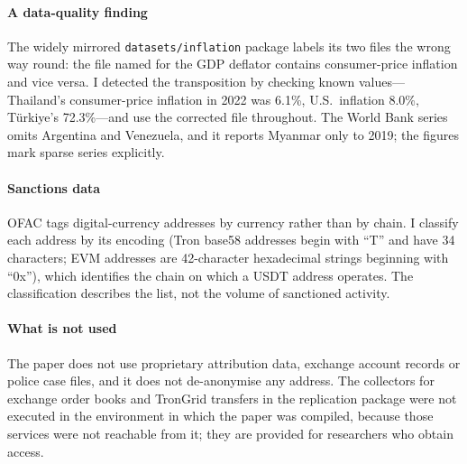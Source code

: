 \paragraph{A data-quality finding}
The widely mirrored \texttt{datasets/inflation} package labels its two files the wrong way round: the file named for
the GDP deflator contains consumer-price inflation and vice versa. I detected the transposition by checking known
values---Thailand's consumer-price inflation in 2022 was 6.1\%, U.S.\ inflation 8.0\%, Türkiye's 72.3\%---and use the
corrected file throughout. The World Bank series omits Argentina and Venezuela, and it reports Myanmar only to 2019;
the figures mark sparse series explicitly.

\paragraph{Sanctions data}
OFAC tags digital-currency addresses by currency rather than by chain. I classify each address by its encoding (Tron
base58 addresses begin with ``T'' and have 34 characters; EVM addresses are 42-character hexadecimal strings beginning
with ``0x''), which identifies the chain on which a USDT address operates. The classification describes the list, not
the volume of sanctioned activity.

\paragraph{What is not used}
The paper does not use proprietary attribution data, exchange account records or police case files, and it does not
de-anonymise any address. The collectors for exchange order books and TronGrid transfers in the replication package
were not executed in the environment in which the paper was compiled, because those services were not reachable from
it; they are provided for researchers who obtain access.
